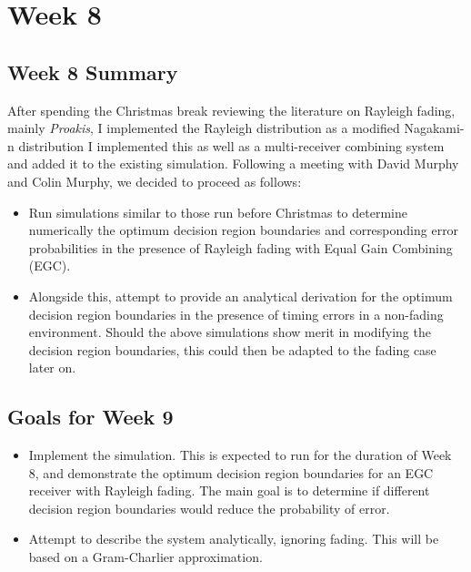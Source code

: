 \section{Week 8}

\subsection{Week 8 Summary}

After spending the Christmas break reviewing the literature on Rayleigh
fading, mainly \emph{Proakis}, I implemented the Rayleigh distribution
as a modified Nagakami-n distribution
I implemented this as well as a multi-receiver combining system and
added it to the existing simulation. Following a meeting with David Murphy and
Colin Murphy, we decided to proceed as follows:

\begin{itemize}
\itemsep1pt\parskip0pt
\item
  Run simulations similar to those run before Christmas to determine
  numerically the optimum decision region boundaries and corresponding
  error probabilities in the presence of Rayleigh fading with Equal Gain
  Combining (EGC).
\item
  Alongside this, attempt to provide an analytical derivation for the
  optimum decision region boundaries in the presence of timing errors in
  a non-fading environment. Should the above simulations show merit in
  modifying the decision region boundaries, this could then be adapted
  to the fading case later on.
\end{itemize}

\subsection{Goals for Week 9}

\begin{itemize}
\itemsep1pt\parskip0pt
\item
  Implement the simulation. This is expected to run for the duration of
  Week 8, and demonstrate the optimum decision region boundaries for an
  EGC receiver with Rayleigh fading. The main goal is to determine if
  different decision region boundaries would reduce the probability of
  error.
\item
  Attempt to describe the system analytically, ignoring fading. This
  will be based on a Gram-Charlier approximation.
\end{itemize}

